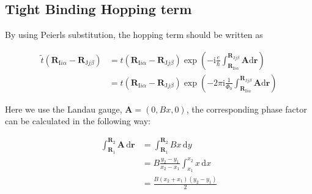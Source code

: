 \documentclass[%
 amsmath,amssymb,
rmp,
]{revtex4-1}
\def \bA    {\mathbf{A}}
\def \I     {\mathrm{I}}
\def \J     {\mathrm{J}}
\def \i     {\mathrm{i}}
\def \bR    {\mathbf{R}}
\def \br    {\mathbf{r}}
\def \d     {\mathrm{d}}
\begin{document}
\subsection{Tight Binding Hopping term}

By using Peierls substitution, the hopping term should be written as 

\begin{equation}
\begin{aligned}
    \tilde{t}(\bR_{\I i \alpha}-\bR_{\J j \beta})&= t(\bR_{\I i \alpha}-\bR_{\J j \beta}) \exp(-\i \frac{e}{\hbar} \int_{\bR_{\I i \alpha}}^{\bR_{\J j \beta}}\bA \d \br)\\
    &=t(\bR_{\I i \alpha}-\bR_{\J j \beta}) \exp(-2\pi\i \frac{1}{\Phi_0} \int_{\bR_{\I i \alpha}}^{\bR_{\J j \beta}}\bA \d \br)
\end{aligned}
\end{equation}


Here we use the Landau gauge, $\bA = (0, Bx, 0)$, the corresponding phase factor can be calculated in the following way:

\begin{equation}
\begin{aligned}
\int_{\bR_1}^{\bR_2} \bA \, \d \br &= \int_{\bR_1}^{\bR_2} Bx \,\d y \\
&= B \frac{y_2-y_1}{x_2-x_1}\int_{x_1}^{x_2} x \,\d x \\
&= \frac{B(x_2+x_1)(y_2-y_1)}{2}
\end{aligned}
\end{equation}
\end{document}
